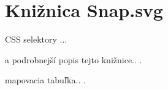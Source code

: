 \chapter{Knižnica Snap.svg}

CSS selektory ... 

a podrobnejší popis tejto knižnice.. .

mapovacia tabuľka.. .